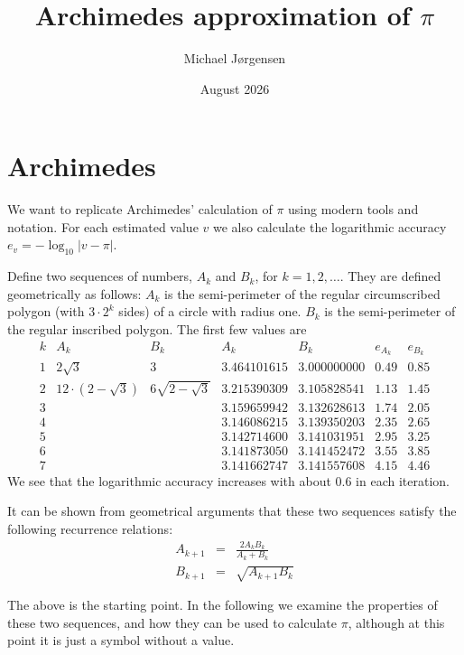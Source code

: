 \documentclass[12pt,oneside,a4paper]{article}
\title{Archimedes approximation of $\pi$}
\date{August 2026}
\author{Michael Jørgensen}
\begin{document}
\maketitle

\section{Archimedes}
We want to replicate Archimedes' calculation of $\pi$ using modern tools and notation. For each estimated value $v$ we also
calculate the logarithmic accuracy $e_v = -\log_{10} |v - \pi|$.

Define two sequences of numbers, $A_k$ and $B_k$, for $k=1, 2, \ldots$. They are defined geometrically as follows:
$A_k$ is the semi-perimeter of the regular circumscribed polygon (with $3\cdot2^k$ sides) of a circle with radius one.
$B_k$ is the semi-perimeter of the regular inscribed polygon.
The first few values are
$$
\begin{array}{r|c|l|l|l|l|l}
    k & A_k & B_k & A_k & B_k & e_{A_k} & e_{B_k} \\ \hline
    1 & 2\sqrt{3} & 3 & 3.464101615 & 3.000000000 & 0.49 & 0.85 \\ \hline
    2 & 12\cdot(2-\sqrt{3}) & 6\sqrt{2-\sqrt{3}} & 3.215390309 & 3.105828541 & 1.13 & 1.45 \\ \hline
    3 & & & 3.159659942 & 3.132628613 & 1.74 & 2.05 \\ \hline
    4 & & & 3.146086215 & 3.139350203 & 2.35 & 2.65 \\ \hline
    5 & & & 3.142714600 & 3.141031951 & 2.95 & 3.25 \\ \hline
    6 & & & 3.141873050 & 3.141452472 & 3.55 & 3.85 \\ \hline
    7 & & & 3.141662747 & 3.141557608 & 4.15 & 4.46
\end{array}
$$
We see that the logarithmic accuracy increases with about $0.6$ in each iteration.

It can be shown from geometrical arguments that these two sequences satisfy the following recurrence relations:
\begin{eqnarray}
    A_{k+1} &=& \frac{2 A_k B_k}{A_k + B_k} \label{eq_ak}\\
    B_{k+1} &=& \sqrt{A_{k+1} B_k} \label{eq_bk}
\end{eqnarray}

The above is the starting point. In the following we examine the properties of these two sequences, and how they
can be used to calculate $\pi$, although at this point it is just a symbol without a value.
\end{document}
